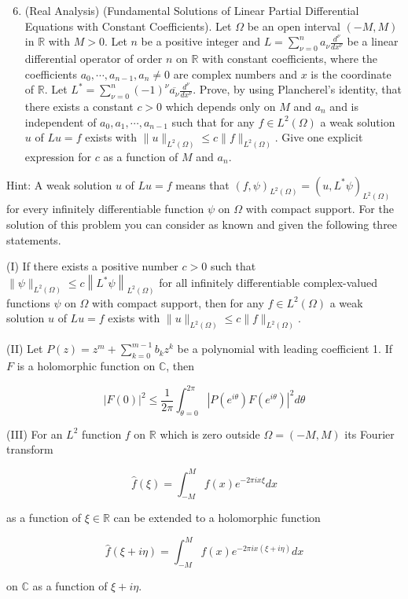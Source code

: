 \documentclass[10pt]{article}
\begin{document}
\begin{enumerate}
  \setcounter{enumi}{5}
  \item (Real Analysis) (Fundamental Solutions of Linear Partial Differential Equations with Constant Coefficients). Let $\Omega$ be an open interval $(-M, M)$ in $\mathbb{R}$ with $M>0$. Let $n$ be a positive integer and $L=\sum_{\nu=0}^{n} a_{\nu} \frac{d^{\nu}}{d x^{\nu}}$ be a linear differential operator of order $n$ on $\mathbb{R}$ with constant coefficients, where the coefficients $a_{0}, \cdots, a_{n-1}, a_{n} \neq 0$ are complex numbers and $x$ is the coordinate of $\mathbb{R}$. Let $L^{*}=\sum_{\nu=0}^{n}(-1)^{\nu} \overline{a_{\nu}} \frac{d^{\nu}}{d x^{\nu}}$. Prove, by using Plancherel's identity, that there exists a constant $c>0$ which depends only on $M$ and $a_{n}$ and is independent of $a_{0}, a_{1}, \cdots, a_{n-1}$ such that for any $f \in L^{2}(\Omega)$ a weak solution $u$ of $L u=f$ exists with $\|u\|_{L^{2}(\Omega)} \leq c\|f\|_{L^{2}(\Omega)}$. Give one explicit expression for $c$ as a function of $M$ and $a_{n}$.
\end{enumerate}

Hint: A weak solution $u$ of $L u=f$ means that $(f, \psi)_{L^{2}(\Omega)}=\left(u, L^{*} \psi\right)_{L^{2}(\Omega)}$ for every infinitely differentiable function $\psi$ on $\Omega$ with compact support. For the solution of this problem you can consider as known and given the following three statements.

(I) If there exists a positive number $c>0$ such that $\|\psi\|_{L^{2}(\Omega)} \leq c\left\|L^{*} \psi\right\|_{L^{2}(\Omega)}$ for all infinitely differentiable complex-valued functions $\psi$ on $\Omega$ with compact support, then for any $f \in L^{2}(\Omega)$ a weak solution $u$ of $L u=f$ exists with $\|u\|_{L^{2}(\Omega)} \leq c\|f\|_{L^{2}(\Omega)}$.

(II) Let $P(z)=z^{m}+\sum_{k=0}^{m-1} b_{k} z^{k}$ be a polynomial with leading coefficient 1. If $F$ is a holomorphic function on $\mathbb{C}$, then

$$
|F(0)|^{2} \leq \frac{1}{2 \pi} \int_{\theta=0}^{2 \pi}\left|P\left(e^{i \theta}\right) F\left(e^{i \theta}\right)\right|^{2} d \theta
$$

(III) For an $L^{2}$ function $f$ on $\mathbb{R}$ which is zero outside $\Omega=(-M, M)$ its Fourier transform

$$
\hat{f}(\xi)=\int_{-M}^{M} f(x) e^{-2 \pi i x \xi} d x
$$

as a function of $\xi \in \mathbb{R}$ can be extended to a holomorphic function

$$
\hat{f}(\xi+i \eta)=\int_{-M}^{M} f(x) e^{-2 \pi i x(\xi+i \eta)} d x
$$

on $\mathbb{C}$ as a function of $\xi+i \eta$.
\end{document}

